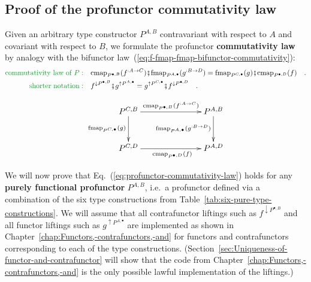 \subsection{Proof of the profunctor commutativity law\label{subsec:Proof-of-the-profunctor-commutativity-law}}

Given an arbitrary type constructor $P^{A,B}$ contravariant with
respect to $A$ and covariant with respect to $B$, we formulate the
profunctor \textbf{commutativity law}
by analogy with the bifunctor law~(\ref{eq:f-fmap-fmap-bifunctor-commutativity}):
\begin{align}
{\color{greenunder}\text{commutativity law of }P:}\quad & \text{cmap}_{P^{\bullet,B}}(f^{:A\rightarrow C})\bef\text{fmap}_{P^{A,\bullet}}(g^{:B\rightarrow D})=\text{fmap}_{P^{C,\bullet}}(g)\bef\text{cmap}_{P^{\bullet,D}}(f)\quad.\nonumber \\
{\color{greenunder}\text{shorter notation}:}\quad & f^{\downarrow P^{\bullet,B}}\bef g^{\uparrow P^{A,\bullet}}=g^{\uparrow P^{C,\bullet}}\bef f^{\downarrow P^{\bullet,D}}\quad.\label{eq:profunctor-commutativity-law}
\end{align}

\begin{wrapfigure}{l}{0.38\columnwidth}%
\vspace{-1.7\baselineskip}
\[
\xymatrix{\xyScaleY{2.5pc}\xyScaleX{6.0pc}P^{C,B}\ar[r]\sp(0.55){\text{cmap}_{P^{\bullet,B}}(f^{:A\rightarrow C})~~~}\ar[d]\sb(0.45){\text{fmap}_{P^{C,\bullet}}(g)} & P^{A,B}\ar[d]\sb(0.45){\text{fmap}_{P^{A,\bullet}}(g^{:B\rightarrow D})}\\
P^{C,D}\ar[r]\sb(0.45){~~~~\text{cmap}_{P^{\bullet,D}}(f)} & P^{A,D}
}
\]

\vspace{-1.7\baselineskip}
\end{wrapfigure}%

We will now prove that Eq.~(\ref{eq:profunctor-commutativity-law})
holds for any \textbf{purely functional profunctor}
$P^{A,B}$, i.e.~a profunctor defined via a combination of the six
type constructions from Table~\ref{tab:six-pure-type-constructions}.
We will assume that all contrafunctor liftings such as $f^{\downarrow P^{\bullet,B}}$
and all functor liftings such as $g^{\uparrow P^{A,\bullet}}$ are
implemented as shown in Chapter~\ref{chap:Functors,-contrafunctors,-and}
for functors and contrafunctors corresponding to each of the type
constructions. (Section~\ref{sec:Uniqueness-of-functor-and-contrafunctor}
will show that the code from Chapter~\ref{chap:Functors,-contrafunctors,-and}
is the only possible lawful implementation of the liftings.)

